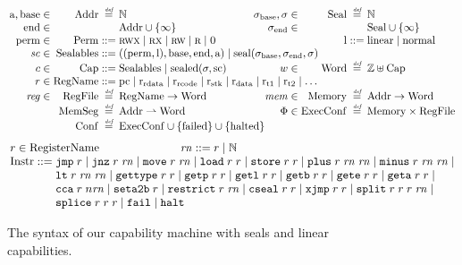 \documentclass[acmsmall,review,showframe]{acmart}\settopmatter{printfolios=true,printccs=false,printacmref=false}
\renewcommand{\MemSeg}{\shareddom{MemSeg}}
\renewcommand{\Reg}{\shareddom{RegFile}}
\renewcommand{\RegName}{\shareddom{RegName}}
\renewcommand{\SealableCaps}{\shareddom{Sealables}}
\renewcommand{\rretc}{\mathrm{r}_{\mathrm{rcode}}}
\renewcommand{\rretd}{\mathrm{r}_{\mathrm{rdata}}}
\begin{document}
\begin{figure}[tb]
  \centering
  \[
  \arraycolsep=1.4pt
  \begin{array}{rrcl l rrcl}
   \addrbnf,\basebnf \in & \Addr & \defeq & \nats & \phantom{mak} & \sealbasebnf, \sigma \in & \Seal & \defeq & \nats\\
    \aendbnf \in & & & \Addr \cup \{\infty \} & & \sealendbnf \in & & & \Seal \cup \{\infty \}\\
    \permbnf \in& \Perm & \defbnf & \rwx \mid \rx \mid \rw \mid \ro \mid \noperm & & &\linbnf & \defbnf & \linear \mid \normal\\
    \vsc \in &\SealableCaps&\defbnf & \multicolumn{6}{l}{((\permbnf,\linbnf),\basebnf,\aendbnf,\addrbnf) \mid \seal{\sealbasebnf,\sealendbnf,\sigma}}\\
    c \in&\Caps& \defbnf &  \SealableCaps \mid \sealed{\sigma,\scbnf} & & w \in &\Word & \defeq & \ints \uplus \Caps\\ 
    r \in& \RegName & \defbnf & \multicolumn{6}{l}{\pcreg \mid \rretd \mid \rretc \mid \rstk \mid \rdata \mid \rtmp{1} \mid \rtmp{2} \mid \dots} \\
    \reg \in &\Reg & \defeq & \RegName \fun \Word & & \mem \in&\Mem & \defeq & \Addr \fun \Word\\
    &\MemSeg & \defeq & \Addr \parfun \Word & & \Phi \in & \ExecConf & \defeq & \Mem \times \Reg\\
    &\Conf & \defeq & \multicolumn{6}{l}{\ExecConf \cup \{\failed\} \cup \{\halted\} }
  \end{array}
\]
\[
  \arraycolsep=1.4pt
\begin{array}{rcl}
\multicolumn{3}{l}{    \arraycolsep=0pt
      \com{r} \in  \tRegName \hspace{2.5cm}   \com{\rn} \defbnf \com{r} \mid \nats
}\\
  \Instr &\defbnf & \tjmp{\com{r}} \mid \tjnz{\com{r}}{\com{\rn}} \mid \tmove{\com{r}}{\com{\rn}} \mid \tload{\com{r}}{\com{r}} \mid \tstore{\com{r}}{\com{r}} \mid \tplus{\com{r}}{\com{\rn}}{\com{\rn}} \mid \tminus{\com{r}}{\com{\rn}}{\com{\rn}} \mid\\
         & & \tlt{\com{r}}{\com{\rn}}{\com{\rn}} \mid \tisptr{\com{r}}{\com{r}} \mid\tgetp{\com{r}}{\com{r}} \mid \tgetlin{\com{r}}{\com{r}} \mid \tgetb{\com{r}}{\com{r}} \mid \tgete{\com{r}}{\com{r}} \mid \tgeta{\com{r}}{\com{r}}  \mid \\
  & & \tcca{\com{r}}{\com{n\rn}} \mid \tsetatob{\com{r}} \mid \trestrict{\com{r}}{\com{\rn}} \mid \tcseal{\com{r}}{\com{r}} \mid \txjmp{\com{r}}{\com{r}} \mid  \tsplit{\com{r}}{\com{r}}{\com{r}}{\com{\rn}} \mid\\ 
      & & \tsplice{\com{r}}{\com{r}}{\com{r}} \mid \tfail \mid \thalt 
\end{array}
\]
  \caption{The syntax of our capability machine with seals and linear capabilities.}
  \label{fig:target-syntax}
\end{figure}
\end{document}
